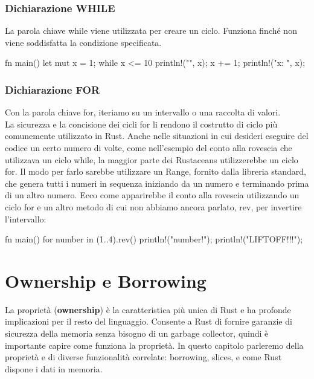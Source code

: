 \documentclass[11pt,a4paper]{article}
\begin{document}
\subsubsection{Dichiarazione WHILE}
La parola chiave while viene utilizzata per creare un ciclo. Funziona finché non viene soddisfatta la condizione specificata.

\begin{rust}
fn main() {
	let mut x = 1;
	while x <= 10 {
		println!("{}", x);
		x += 1;
	}
	println!("x: {}", x);
}

\end{rust}

\subsubsection{Dichiarazione FOR}
Con la parola chiave for, iteriamo su un intervallo o una raccolta di valori.\\
La sicurezza e la concisione dei cicli for li rendono il costrutto di ciclo più comunemente utilizzato in Rust. Anche nelle situazioni in cui desideri eseguire del codice un certo numero di volte, come nell'esempio del conto alla rovescia che utilizzava un ciclo while, la maggior parte dei Rustaceans utilizzerebbe un ciclo for. Il modo per farlo sarebbe utilizzare un Range, fornito dalla libreria standard, che genera tutti i numeri in sequenza iniziando da un numero e terminando prima di un altro numero.
Ecco come apparirebbe il conto alla rovescia utilizzando un ciclo for e un altro metodo di cui non abbiamo ancora parlato, rev, per invertire l'intervallo:
\begin{rust}
fn main() {
    for number in (1..4).rev() {
        println!("{number}!");
    }
    println!("LIFTOFF!!!");
}
\end{rust}

\section{Ownership e Borrowing}

La proprietà (\textbf{ownership}) è la caratteristica più unica di Rust e ha profonde implicazioni per il resto del linguaggio. Consente a Rust di fornire garanzie di sicurezza della memoria senza bisogno di un garbage collector, quindi è importante capire come funziona la proprietà. In questo capitolo parleremo della proprietà e di diverse funzionalità correlate: borrowing, slices, e come Rust dispone i dati in memoria.
\end{document}
